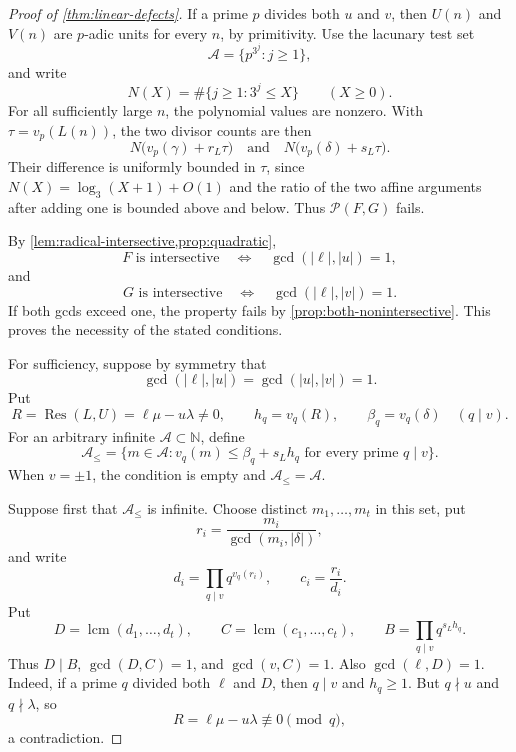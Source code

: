 \documentclass[11pt]{amsart}
\newcommand{\N}{\mathbb N}
\newcommand{\cP}{\mathcal P}
\newcommand{\lcm}{\operatorname{lcm}}
\newcommand{\Res}{\operatorname{Res}}
\theoremstyle{definition}
\begin{document}
\begin{proof}[Proof of \cref{thm:linear-defects}]
If a prime \(p\) divides both \(u\) and \(v\), then \(U(n)\) and \(V(n)\)
are \(p\)-adic units for every \(n\), by primitivity.  Use the lacunary test
set
\[
  \mathcal A=\{p^{3^j}:j\ge1\},
\]
and write
\[
  N(X)=\#\{j\ge1:3^j\le X\}\qquad(X\ge0).
\]
For all sufficiently large \(n\), the polynomial values are nonzero.  With
\(\tau=v_p(L(n))\), the two divisor counts are then
\[
  N\bigl(v_p(\gamma)+r_L\tau\bigr)
  \quad\text{and}\quad
  N\bigl(v_p(\delta)+s_L\tau\bigr).
\]
Their difference is uniformly bounded in \(\tau\), since
\(N(X)=\log_3(X+1)+O(1)\) and the ratio of the two affine arguments after
adding one is bounded above and below.  Thus \(\cP(F,G)\) fails.

By \cref{lem:radical-intersective,prop:quadratic},
\[
  F\text{ is intersective}\quad\Longleftrightarrow\quad
  \gcd(|\ell|,|u|)=1,
\]
and
\[
  G\text{ is intersective}\quad\Longleftrightarrow\quad
  \gcd(|\ell|,|v|)=1.
\]
If both gcds exceed one, the property fails by
\cref{prop:both-nonintersective}.  This proves the necessity of the stated
conditions.

For sufficiency, suppose by symmetry that
\[
  \gcd(|\ell|,|u|)=\gcd(|u|,|v|)=1.
\]
Put
\[
  R=\Res(L,U)=\ell\mu-u\lambda\ne0,
  \qquad h_q=v_q(R),\qquad
  \beta_q=v_q(\delta)\quad(q\mid v).
\]
For an arbitrary infinite \(\mathcal A\subset\N\), define
\[
  \mathcal A_{\le}=
  \{m\in\mathcal A:
    v_q(m)\le\beta_q+s_Lh_q\text{ for every prime }q\mid v\}.
\]
When \(v=\pm1\), the condition is empty and
\(\mathcal A_{\le}=\mathcal A\).

Suppose first that \(\mathcal A_{\le}\) is infinite.  Choose distinct
\(m_1,\ldots,m_t\) in this set, put
\[
  r_i=\frac{m_i}{\gcd(m_i,|\delta|)},
\]
and write
\[
  d_i=\prod_{q\mid v}q^{v_q(r_i)},\qquad
  c_i=\frac{r_i}{d_i}.
\]
Put
\[
  D=\lcm(d_1,\ldots,d_t),\qquad
  C=\lcm(c_1,\ldots,c_t),\qquad
  B=\prod_{q\mid v}q^{s_Lh_q}.
\]
Thus \(D\mid B\), \(\gcd(D,C)=1\), and \(\gcd(v,C)=1\).
Also \(\gcd(\ell,D)=1\).  Indeed, if a prime \(q\) divided both
\(\ell\) and \(D\), then \(q\mid v\) and \(h_q\ge1\).  But
\(q\nmid u\) and \(q\nmid\lambda\), so
\[
  R=\ell\mu-u\lambda\not\equiv0\pmod q,
\]
a contradiction.


\end{proof}
\end{document}
